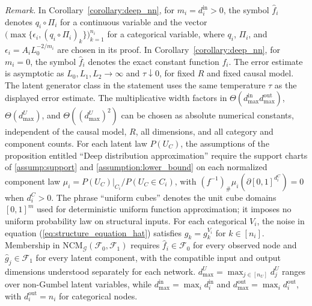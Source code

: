 \noindent\textit{Remark.} In Corollary~\ref{corollary:deep_nn}, for $m_i=d_i^{\text{in}}>0$, the symbol $\hat f_i$ denotes $q_i\circ\Pi_i$ for a continuous variable and the vector $\bigl(\max\{\epsilon_i,(q_i\circ\Pi_i)_k\}\bigr)_{k=1}^{n_i}$ for a categorical variable, where $q_i$, $\Pi_i$, and $\epsilon_i=A_iL_0^{-2/m_i}$ are chosen in its proof. In Corollary~\ref{corollary:deep_nn}, for $m_i=0$, the symbol $\hat f_i$ denotes the exact constant function $f_i$. The error estimate is asymptotic as $L_0,L_1,L_2\to\infty$ and $\tau\downarrow0$, for fixed $R$ and fixed causal model. The latent generator class in the statement uses the same temperature $\tau$ as the displayed error estimate. The multiplicative width factors in $\Theta(d_{\max}^{\text{in}}d_{\max}^{\text{out}})$, $\Theta(d_{\max}^U)$, and $\Theta((d_{\max}^U)^2)$ can be chosen as absolute numerical constants, independent of the causal model, $R$, all dimensions, and all category and component counts. For each latent law $P(U_C)$, the assumptions of the proposition entitled ``Deep distribution approximation'' require the support charts of \cref{assump:support} and \cref{assumption:lower_bound} on each normalized component law $\mu_i=P(U_C)|_{C_i}/P(U_C\in C_i)$, with $(f^{-1})_{\#}\mu_i(\partial[0,1]^{d_i^C})=0$ when $d_i^C>0$. The phrase ``uniform cubes'' denotes the unit cube domains $[0,1]^m$ used for deterministic uniform function approximation; it imposes no uniform probability law on structural inputs. For each categorical $V_i$, the noise in equation (\ref{eq:structure_equation_hat}) satisfies $g_k=g_k^{V_i}$ for $k\in[n_i]$. Membership in $\text{NCM}_{\mathcal G}(\mathcal F_0,\mathcal F_1)$ requires $\hat f_i\in\mathcal F_0$ for every observed node and $\hat g_j\in\mathcal F_1$ for every latent component, with the compatible input and output dimensions understood separately for each network. $d_{\max}^U=\max_{j\in[n_U]}d_j^U$ ranges over non-Gumbel latent variables, while $d_{\max}^{\mathrm{in}}=\max_i d_i^{\mathrm{in}}$ and $d_{\max}^{\mathrm{out}}=\max_i d_i^{\mathrm{out}}$, with $d_i^{\mathrm{out}}=n_i$ for categorical nodes.

